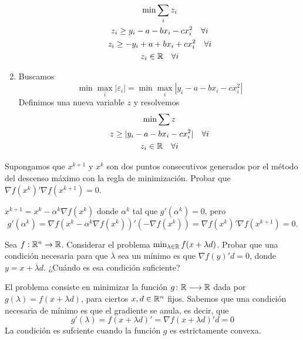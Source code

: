 \documentclass[twoside]{article}
\begin{document}
\begin{ejercicio}{1}
\begin{solucion}
\begin{enumerate}
\begin{gather*}
\min \sum_i z_i\\
z_i\geq y_i -a-bx_i-c x_i^2 \quad \forall i \\
z_i\geq -y_i +a+bx_i+c x_i^2 \quad \forall i\\
z_i \in \mathbb{R} \quad \forall i
\end{gather*}
\item Buscamos
$$
\min \max_i |\varepsilon_i| = \min \max_i |y_i -a-bx_i-c x_i^2|
$$
Definimos una nueva variable $z$ y resolvemos
\begin{gather*}
\min \sum z\\
z\geq |y_i -a-bx_i-c x_i^2| \quad \forall i\\
z_i \in \mathbb{R} \quad \forall i
\end{gather*}
\end{enumerate}
\end{solucion}
\end{ejercicio}

\newpage 

\begin{ejercicio}{2}
Supongamos que $x^{k+1}$ y $x^k$ son dos puntos consecutivos generados por el método del descenso máximo con la regla de minimización. Probar que $\nabla f(x^{k})'\nabla f(x^{k+1})=0$.
\end{ejercicio}
\begin{solucion}
$x^{k+1}=x^k-\alpha^k\nabla f(x^k)$ donde $\alpha^k$ tal que $g'(\alpha^k)=0$, pero $$g'(\alpha^k)=\nabla f(x^k-\alpha^k\nabla f(x^k))'(-\nabla f(x^k))=\nabla f(x^{k})'\nabla f(x^{k+1})=0.$$
\end{solucion}

\newpage

\begin{ejercicio}{3}
Sea $f:\mathbb{R}^n\to\mathbb{R}$. Considerar el problema $\min_{\lambda\in\mathbb{R}}f(x+\lambda d)$. Probar que una condición necesaria para que $\overline{\lambda}$ sea un mínimo es que $\nabla f(y)'d=0$, donde $y=x+\overline{\lambda}d$. ¿Cuándo es esa condición suficiente?
\begin{solucion}
El problema consiste en minimizar la función $g\colon{\mathbb{R}}\longrightarrow{\mathbb{R}}$ dada por $g(\lambda) = f(x+\lambda d)$, para ciertos $x,d\in\mathbb{R}^n$ fijos. Sabemos que una condición necesaria de mínimo es que el gradiente se anula, es decir, que
$$
g'(\lambda) = f(x+\lambda d)' = \nabla f(x+\lambda d)'d = 0
$$
La condición es sufciente cuando la función $g$ es estrictamente convexa.
\end{solucion}
\end{ejercicio}
\end{document}
